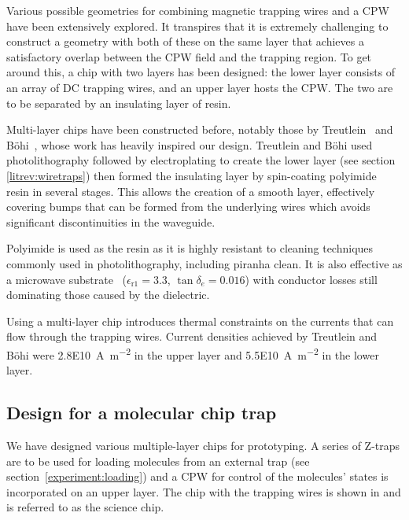 Various possible geometries for combining magnetic trapping wires and a CPW have
been extensively explored. It transpires that it is extremely challenging to
construct a geometry with both of these on the same layer that achieves a
satisfactory overlap between the CPW field and the trapping region. To get
around this, a chip with two layers has been designed: the lower layer consists
of an array of DC trapping wires, and an upper layer hosts the CPW. The two are
to be separated by an insulating layer of resin.

Multi-layer chips have been constructed before, notably those by
Treutlein~\cite{Treutlein2008} and B\"ohi~\cite{rohtua}, whose work has heavily
inspired our design. Treutlein and B\"ohi used photolithography followed by
electroplating to create the lower layer (see section \ref{litrev:wiretraps})
then formed the insulating layer by spin-coating polyimide resin in several
stages. This allows the creation of a smooth layer, effectively covering bumps
that can be formed from the underlying wires which avoids significant
discontinuities in the waveguide.

Polyimide is used as the resin as it is highly resistant to cleaning techniques
commonly used in photolithography, including piranha clean.  It is also
effective as a microwave substrate~\cite{Simons2004}
($\epsilon_\mathrm{r1} = 3.3$, $\tan\delta_e = 0.016$) with conductor losses
still dominating those caused by the dielectric.

Using a multi-layer chip introduces thermal constraints on the currents that can
flow through the trapping wires. Current densities achieved by Treutlein and
B\"ohi were \SI{2.8E10}{\ampere\per\metre\squared} in the upper layer and
\SI{5.5E10}{\ampere\per\metre\squared} in the lower layer.

\subsection{Design for a molecular chip trap}

We have designed various multiple-layer chips for prototyping. A series of
Z-traps are to be used for loading molecules from an external trap (see
section~\ref{experiment:loading}) and a CPW for control of the molecules' states
is incorporated on an upper layer. The chip with the trapping wires is shown in
 and is referred to as the science chip.

